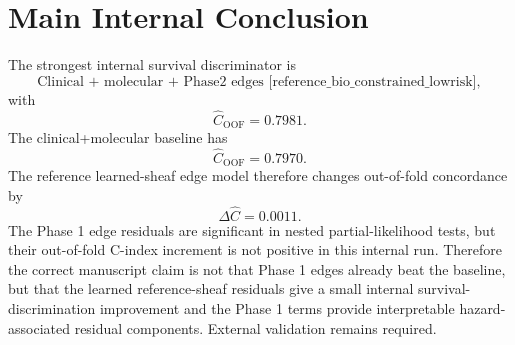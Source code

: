 \documentclass[11pt]{article}
\begin{document}
\section{Main Internal Conclusion}
The strongest internal survival discriminator is
\[
\text{Clinical + molecular + Phase2 edges [reference\_bio\_constrained\_lowrisk]},
\]
with
\[
\widehat C_{\mathrm{OOF}}=0.7981.
\]
The clinical+molecular baseline has
\[
\widehat C_{\mathrm{OOF}}=0.7970.
\]
The reference learned-sheaf edge model therefore changes out-of-fold concordance by
\[
\Delta \widehat C = 0.0011.
\]
The Phase 1 edge residuals are significant in nested partial-likelihood tests, but their out-of-fold C-index increment is not positive in this internal run. Therefore the correct manuscript claim is not that Phase 1 edges already beat the baseline, but that the learned reference-sheaf residuals give a small internal survival-discrimination improvement and the Phase 1 terms provide interpretable hazard-associated residual components. External validation remains required.
\end{document}
